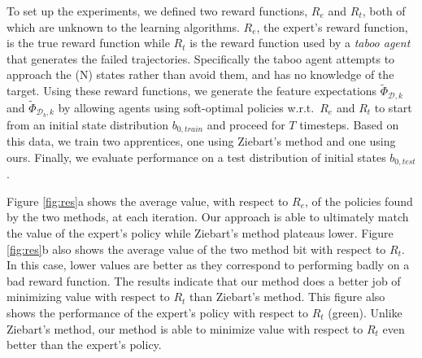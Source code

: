 \documentclass[conference]{IEEEtran}
\begin{document}
To set up the experiments, we defined two reward functions, $R_e$ and $R_t$, both of which are unknown to the learning algorithms.  $R_e$, the expert's reward function, is the true reward function while $R_t$ is the reward function used by a \emph{taboo agent} that generates the failed trajectories. Specifically the taboo agent attempts to approach the (N) states rather than avoid them, and has no knowledge of the target.  Using these reward functions, we generate the feature expectations $\widetilde{\Phi}_{\mathcal{D},k}$ and $\widetilde{\Phi}_{\mathcal{D}_b,k}$ by allowing agents using soft-optimal policies w.r.t.\ $R_e$ and $R_t$ to start from an initial state distribution $b_{0,train}$ and proceed for $T$ timesteps.  Based on this data, we train two apprentices, one using Ziebart's method and one using ours.  Finally, we evaluate performance on a test distribution of initial states $b_{0,test}$. 




Figure \ref{fig:res}a shows the average value, with respect to $R_e$, of the policies found by the two methods, at each iteration.  Our approach is able to ultimately match the value of the expert's policy while Ziebart's method plateaus lower. Figure \ref{fig:res}b also shows the average value of the two method bit with respect to $R_t$.  In this case, lower values are better as they correspond to performing badly on a bad reward function.  The results indicate that our method does a better job of minimizing value with respect to $R_t$ than Ziebart's method.  This figure also shows the performance of the expert's policy with respect to $R_t$ (green). Unlike Ziebart's method, our method is able to minimize value with respect to $R_t$ even better than the expert's policy.
\end{document}
